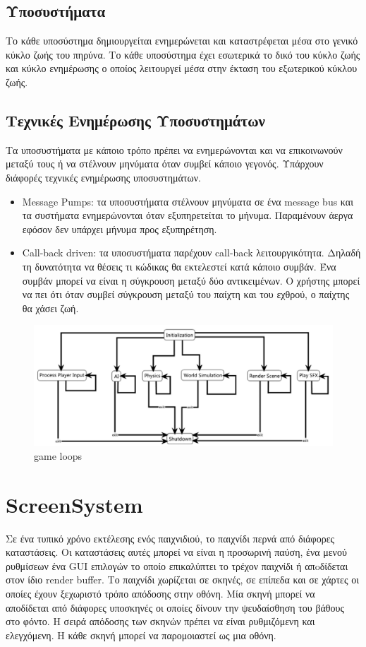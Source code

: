 	\subsection{Υποσυστήματα}
	Το κάθε υποσύστημα δημιουργείται ενημερώνεται και καταστρέφεται μέσα στο γενικό κύκλο ζωής του πηρύνα. Το κάθε υποσύστημα έχει εσωτερικά το δικό του κύκλο ζωής και κύκλο ενημέρωσης ο οποίος λειτουργεί μέσα στην έκταση του εξωτερικού κύκλου ζωής.
	
	\subsection{Τεχνικές Ενημέρωσης Υποσυστημάτων}
	Τα υποσυστήματα με κάποιο τρόπο πρέπει να ενημερώνονται και να επικοινωνούν μεταξύ τους ή να στέλνουν μηνύματα όταν συμβεί κάποιο γεγονός. Υπάρχουν διάφορές τεχνικές ενημέρωσης υποσυστημάτων.
	\begin{itemize}
	\item Message Pumps: τα υποσυστήματα στέλνουν μηνύματα σε ένα message bus και τα συστήματα ενημερώνονται όταν εξυπηρετείται το μήνυμα. Παραμένουν άεργα εφόσον δεν υπάρχει μήνυμα προς εξυπηρέτηση.
	\item Call-back driven: τα υποσυστήματα παρέχουν call-back λειτουργικότητα. Δηλαδή τη δυνατότητα να θέσεις τι κώδικας θα εκτελεστεί κατά κάποιο συμβάν. Ένα συμβάν μπορεί να είναι η σύγκρουση μεταξύ δύο αντικειμένων. Ο χρήστης μπορεί να πει ότι όταν συμβεί σύγκρουση μεταξύ του παίχτη και του εχθρού, ο παίχτης θα χάσει ζωή.
	\end{itemize}
	
	\begin{figure}[h!]
		\centering
		\includegraphics[width=160mm]{Images/game_coding_complete_chapter7_gameloops}
		\caption{game loops}
		\label{fig:gameloops}
	\end{figure}
		
	\section{ScreenSystem}
	Σε ένα τυπικό χρόνο εκτέλεσης ενός παιχνιδιού, το παιχνίδι περνά από διάφορες καταστάσεις. Οι καταστάσεις αυτές μπορεί να είναι η προσωρινή παύση, ένα μενού ρυθμίσεων ένα \gls{GUI} επιλογών το οποίο επικαλύπτει το τρέχον παιχνίδι ή απoδίδεται στον ίδιο render buffer. Το παιχνίδι χωρίζεται σε σκηνές, σε επίπεδα και σε χάρτες οι οποίες έχουν ξεχωριστό τρόπο απόδοσης στην οθόνη. Μία σκηνή μπορεί να αποδίδεται από διάφορες υποσκηνές οι οποίες δίνουν την ψευδαίσθηση του βάθους στο φόντο. Η σειρά απόδοσης των σκηνών πρέπει να είναι ρυθμιζόμενη και ελεγχόμενη. Η κάθε σκηνή μπορεί να παρομοιαστεί ως μια οθόνη.

